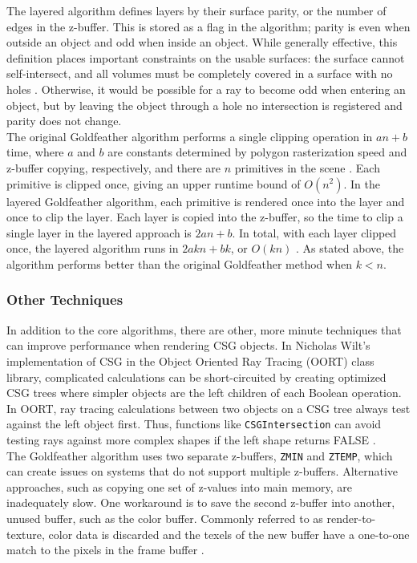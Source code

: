 \documentclass[12pt]{article}
\begin{document}
\begin{doublespace}
The layered algorithm defines layers by their surface parity, or the number of edges in the z-buffer. This is stored as a flag in the algorithm; parity is even when outside an object and odd when inside an object. While generally effective, this definition places important constraints on the usable surfaces: the surface cannot self-intersect, and all volumes must be completely covered in a surface with no holes \cite{layered_gold}. Otherwise, it would be possible for a ray to become odd when entering an object, but by leaving the object through a hole no intersection is registered and parity does not change.\\

The original Goldfeather algorithm performs a single clipping operation in $an+b$ time, where $a$ and $b$ are constants determined by polygon rasterization speed and z-buffer copying, respectively, and there are $n$ primitives in the scene \cite{layered_gold}. Each primitive is clipped once, giving an upper runtime bound of $O(n^2)$. In the layered Goldfeather algorithm, each primitive is rendered once into the layer and once to clip the layer. Each layer is copied into the z-buffer, so the time to clip a single layer in the layered approach is $2an+b$. In total, with each layer clipped once, the layered algorithm runs in $2akn+bk$, or $O(kn)$ \cite{layered_gold}. As stated above, the algorithm performs better than the original Goldfeather method when $k<n$.

\subsubsection{Other Techniques}
In addition to the core algorithms, there are other, more minute techniques that can improve performance when rendering CSG objects. In Nicholas Wilt's implementation of CSG in the Object Oriented Ray Tracing (OORT) class library, complicated calculations can be short-circuited by creating optimized CSG trees where simpler objects are the left children of each Boolean operation. In OORT, ray tracing calculations between two objects on a CSG tree always test against the left object first. Thus, functions like \texttt{CSGIntersection} can avoid testing rays against more complex shapes if the left shape returns FALSE \cite{raytrace}.\\

The Goldfeather algorithm uses two separate z-buffers, \texttt{ZMIN} and \texttt{ZTEMP}, which can create issues on systems that do not support multiple z-buffers. Alternative approaches, such as copying one set of z-values into main memory, are inadequately slow. One workaround is to save the second z-buffer into another, unused buffer, such as the color buffer. Commonly referred to as render-to-texture, color data is discarded and the texels of the new buffer have a one-to-one match to the pixels in the frame buffer \cite{hardware_csg}.\\


\end{doublespace}
\end{document}
